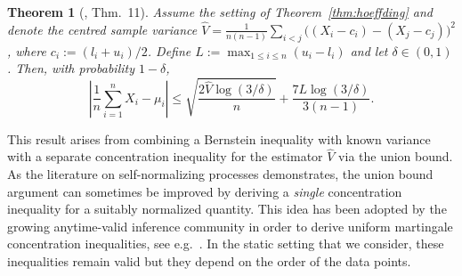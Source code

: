 \documentclass[aos]{imsart2}
\theoremstyle{plain}
\newtheorem{theorem}{Theorem}[section]
\theoremstyle{definition}
\newcommand{\xb}{\bar{X}}
\newcommand{\vh}{\hat{V}}
\begin{document}

\begin{theorem}[\cite{maurer_empirical_2009}, Thm.~11]\label{thm:mp}
    Assume the setting of Theorem~\ref{thm:hoeffding} and denote the centred sample variance $\vh = \frac{1}{n(n-1)} \sum_{i<j} \big((X_i-c_i) - (X_j-c_j)\big)^2$, where $c_i := (l_i+u_i)/2$. Define $L:=\max_{1\leq i \leq n}(u_i-l_i)$ and let $\delta \in (0,1)$. 
    Then, with probability $1-\delta$,
    \begin{equation*}
        \left\vert \frac{1}{n}\sum_{i=1}^n X_i-\mu_i \right\vert \leq \sqrt{\frac{2 \vh \log(3/\delta)}{n}} + \frac{7L \log(3/\delta)}{3(n-1)}.
    \end{equation*}
\end{theorem}

This result arises from combining a Bernstein inequality with known variance with a separate concentration inequality for the estimator $\vh$ via the union bound. As the literature on self-normalizing processes \citep{de_la_pena_self-normalized_2009} demonstrates, the union bound argument can sometimes be improved by deriving a \emph{single} concentration inequality for a suitably normalized quantity. This idea has been adopted by the growing anytime-valid inference community in order to derive uniform martingale concentration inequalities, see e.g.\ \citet{howard_time-uniform_2021, waudby-smith_estimating_2024}. In the static setting that we consider, these inequalities remain valid but they depend on the order of the data points.
\end{document}
